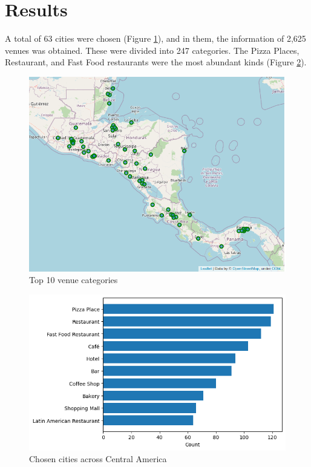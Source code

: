 \documentclass[letterpaper,12pt]{article}
\begin{document}
\section{Results}

A total of 63 cities were chosen (Figure \ref{fig:cities}), and in them, the information of 2,625 venues was obtained. These were divided into 247 categories. The Pizza Places, Restaurant, and Fast Food restaurants were the most abundant kinds (Figure \ref{fig:categories}).

\begin{figure}[h]
    \centering
    \includegraphics[width=\textwidth]{cities.png}
    \caption{Top 10 venue categories}
    \label{fig:cities}
\end{figure}

\begin{figure}[h]
    \centering
    \includegraphics[width=\textwidth]{images/categories.png}
    \caption{Chosen cities across Central America}
    \label{fig:categories}
\end{figure}
\end{document}
